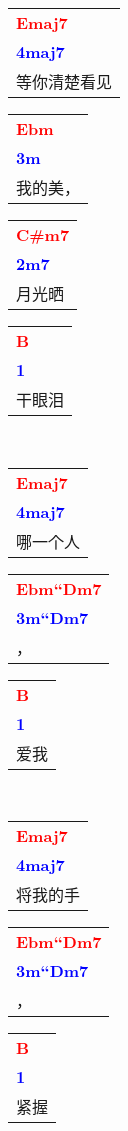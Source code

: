 \documentclass[12pt,a4paper,openany,UTF8]{memoir}
\begin{document}
\begin{tabular}[b]{l}
    \textbf{\textcolor{red}{Emaj7}}\\\textbf{\textcolor{blue}{4maj7}}\\
    等你清楚看见\mbox{}\end{tabular}\begin{tabular}[b]{l}
    \textbf{\textcolor{red}{Ebm}}\\\textbf{\textcolor{blue}{3m}}\\
    我的美，\mbox{}\end{tabular}\begin{tabular}[b]{l}
    \textbf{\textcolor{red}{C\#m7}}\\\textbf{\textcolor{blue}{2m7}}\\
    月光晒\mbox{}\end{tabular}\begin{tabular}[b]{l}
    \textbf{\textcolor{red}{B}}\\\textbf{\textcolor{blue}{1}}\\
    干眼泪\mbox{}\end{tabular}\\
\begin{tabular}[b]{l}
    \textbf{\textcolor{red}{Emaj7}}\\\textbf{\textcolor{blue}{4maj7}}\\
    哪一个人\mbox{}\end{tabular}\begin{tabular}[b]{l}
    \textbf{\textcolor{red}{Ebm``Dm7}}\\\textbf{\textcolor{blue}{3m``Dm7}}\\
    ，\mbox{}\end{tabular}\begin{tabular}[b]{l}
    \textbf{\textcolor{red}{B}}\\\textbf{\textcolor{blue}{1}}\\
    爱我\mbox{}\end{tabular}\\
\begin{tabular}[b]{l}
    \textbf{\textcolor{red}{Emaj7}}\\\textbf{\textcolor{blue}{4maj7}}\\
    将我的手\mbox{}\end{tabular}\begin{tabular}[b]{l}
    \textbf{\textcolor{red}{Ebm``Dm7}}\\\textbf{\textcolor{blue}{3m``Dm7}}\\
    ，\mbox{}\end{tabular}\begin{tabular}[b]{l}
    \textbf{\textcolor{red}{B}}\\\textbf{\textcolor{blue}{1}}\\
    紧握\mbox{}\end{tabular}\\
\end{document}
